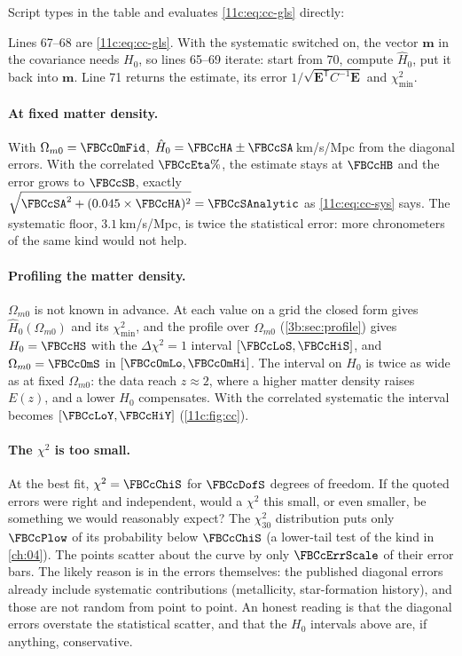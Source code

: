 Script  types in the table and evaluates
\eqref{11c:eq:cc-gls} directly:


\noindent Lines 67--68 are \eqref{11c:eq:cc-gls}. With the systematic switched on, the
vector $\bm m$ in the covariance needs $H_0$, so lines 65--69 iterate: start from $70$,
compute $\hat H_0$, put it back into $\bm m$. Line 71 returns the estimate, its error
$1/\sqrt{\bm E^{\mathsf T}C^{-1}\bm E}$ and $\chi^2_{\min}$.

\paragraph{At fixed matter density.} With $\Omega_{m0}=\FBCcOmFid$,
$\hat H_0=\FBCcHA\pm\FBCcSA$\,km/s/Mpc from the diagonal errors. With the correlated
$\FBCcEta\%$, the estimate stays at $\FBCcHB$ and the error grows to $\FBCcSB$, exactly
$\sqrt{\FBCcSA^2+(0.045\times\FBCcHA)^2}=\FBCcSAnalytic$ as \eqref{11c:eq:cc-sys} says. The
systematic floor, $3.1$\,km/s/Mpc, is twice the statistical error: more chronometers of
the same kind would not help.

\paragraph{Profiling the matter density.} $\Omega_{m0}$ is not known in advance. At each
value on a grid the closed form gives $\hat H_0(\Omega_{m0})$ and its $\chi^2_{\min}$, and the
profile over $\Omega_{m0}$ (\cref{3b:sec:profile}) gives $H_0=\FBCcHS$ with the
$\Delta\chi^2=1$ interval $[\FBCcLoS,\FBCcHiS]$, and $\Omega_{m0}=\FBCcOmS$ in
$[\FBCcOmLo,\FBCcOmHi]$. The interval on $H_0$ is twice as wide as at fixed $\Omega_{m0}$:
the data reach $z\approx2$, where a higher matter density raises $E(z)$, and a lower
$H_0$ compensates. With the correlated systematic the interval becomes
$[\FBCcLoY,\FBCcHiY]$ (\cref{11c:fig:cc}).

\paragraph{The $\chi^2$ is too small.} At the best fit, $\chi^2=\FBCcChiS$ for $\FBCcDofS$
degrees of freedom. If the quoted errors were right and independent, would a
$\chi^2$ this small, or even smaller, be something we would reasonably expect? The
$\chi^2_{30}$ distribution puts only $\FBCcPlow$ of its probability below $\FBCcChiS$ (a
lower-tail test of the kind in \cref{ch:04}). The points scatter about the curve by
only $\FBCcErrScale$ of their error bars. The likely reason is in the errors
themselves: the published diagonal errors already include systematic contributions
(metallicity, star-formation history), and those are not random from point to point.
An honest reading is that the diagonal errors overstate the statistical scatter, and
that the $H_0$ intervals above are, if anything, conservative.

